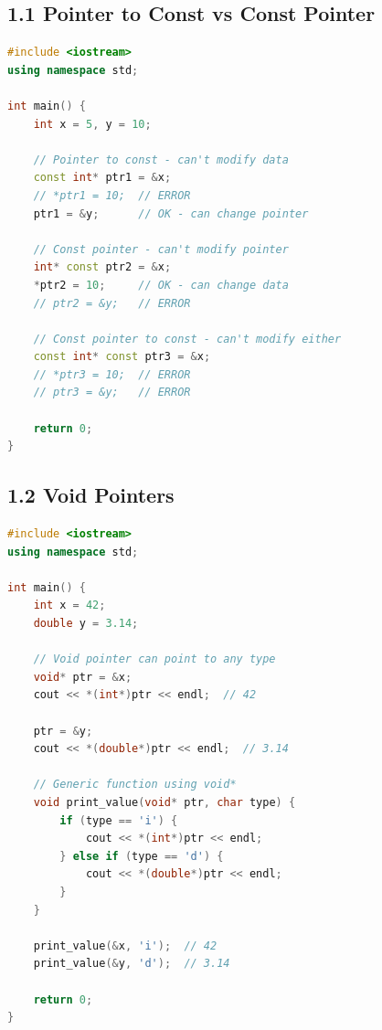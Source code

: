 \hypertarget{pointer-to-const-vs-const-pointer}{%
\subsection{1.1 Pointer to Const vs Const
Pointer}\label{pointer-to-const-vs-const-pointer}}

\begin{lstlisting}[language={C++}]
#include <iostream>
using namespace std;

int main() {
    int x = 5, y = 10;

    // Pointer to const - can't modify data
    const int* ptr1 = &x;
    // *ptr1 = 10;  // ERROR
    ptr1 = &y;      // OK - can change pointer

    // Const pointer - can't modify pointer
    int* const ptr2 = &x;
    *ptr2 = 10;     // OK - can change data
    // ptr2 = &y;   // ERROR

    // Const pointer to const - can't modify either
    const int* const ptr3 = &x;
    // *ptr3 = 10;  // ERROR
    // ptr3 = &y;   // ERROR

    return 0;
}
\end{lstlisting}

\hypertarget{void-pointers}{%
\subsection{1.2 Void Pointers}\label{void-pointers}}

\begin{lstlisting}[language={C++}]
#include <iostream>
using namespace std;

int main() {
    int x = 42;
    double y = 3.14;

    // Void pointer can point to any type
    void* ptr = &x;
    cout << *(int*)ptr << endl;  // 42

    ptr = &y;
    cout << *(double*)ptr << endl;  // 3.14

    // Generic function using void*
    void print_value(void* ptr, char type) {
        if (type == 'i') {
            cout << *(int*)ptr << endl;
        } else if (type == 'd') {
            cout << *(double*)ptr << endl;
        }
    }

    print_value(&x, 'i');  // 42
    print_value(&y, 'd');  // 3.14

    return 0;
}
\end{lstlisting}

